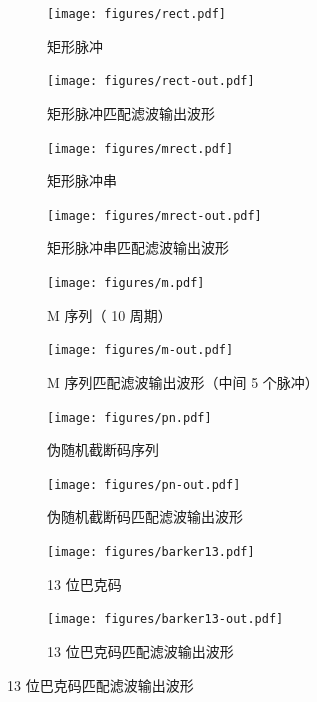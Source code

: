 \documentclass[../main]{subfiles}
\begin{document}
\begin{figure}[htbp]
  \centering
  \begin{subfigure}[htbp]{0.23\linewidth}
    \centering
    \texttt{[image: figures/rect.pdf]}
    \caption{矩形脉冲}%
    \label{fig:rect_}
  \end{subfigure}
  \quad
  \begin{subfigure}[htbp]{0.23\linewidth}
    \centering
    \texttt{[image: figures/rect-out.pdf]}
    \caption{矩形脉冲匹配滤波输出波形}%
    \label{fig:rect-out_}
  \end{subfigure}

  \begin{subfigure}[htbp]{0.23\linewidth}
    \centering
    \texttt{[image: figures/mrect.pdf]}
    \caption{矩形脉冲串}%
    \label{fig:mrect_}
  \end{subfigure}
  \quad
  \begin{subfigure}[htbp]{0.23\linewidth}
    \centering
    \texttt{[image: figures/mrect-out.pdf]}
    \caption{矩形脉冲串匹配滤波输出波形}%
    \label{fig:mrect-out_}
  \end{subfigure}

  \begin{subfigure}[htbp]{0.23\linewidth}
    \centering
    \texttt{[image: figures/m.pdf]}
    \caption{M 序列（ 10 周期）}%
    \label{fig:m_}
  \end{subfigure}
  \quad
  \begin{subfigure}[htbp]{0.23\linewidth}
    \centering
    \texttt{[image: figures/m-out.pdf]}
    \caption{M 序列匹配滤波输出波形（中间 5 个脉冲）}%
    \label{fig:m-out_}
  \end{subfigure}

  \begin{subfigure}[htbp]{0.23\linewidth}
    \centering
    \texttt{[image: figures/pn.pdf]}
    \caption{伪随机截断码序列}%
    \label{fig:pn_}
  \end{subfigure}
  \quad
  \begin{subfigure}[htbp]{0.23\linewidth}
    \centering
    \texttt{[image: figures/pn-out.pdf]}
    \caption{伪随机截断码匹配滤波输出波形}%
    \label{fig:pn-out_}
  \end{subfigure}

  \begin{subfigure}[htbp]{0.23\linewidth}
    \centering
    \texttt{[image: figures/barker13.pdf]}
    \caption{13 位巴克码}%
    \label{fig:barker13_}
  \end{subfigure}
  \quad
  \begin{subfigure}[htbp]{0.23\linewidth}
    \centering
    \texttt{[image: figures/barker13-out.pdf]}
    \caption{13 位巴克码匹配滤波输出波形}%
    \label{fig:barker13-out_}
  \end{subfigure}


\end{figure}
\end{document}
